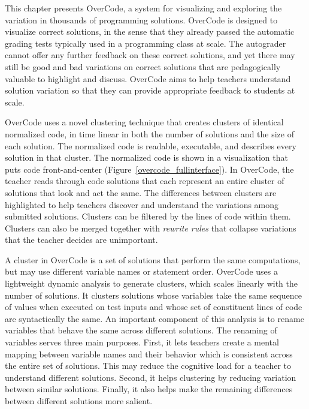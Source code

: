 This chapter presents OverCode, a system for visualizing and exploring the variation in thousands of programming solutions. OverCode is designed to visualize correct solutions, in the sense that they already passed the automatic grading tests typically used in a programming class at scale. The autograder cannot offer any further feedback on these correct solutions, and yet there may still be good and bad variations on correct solutions that are pedagogically valuable to highlight and discuss. OverCode aims to help teachers understand solution variation so that they can provide appropriate feedback to students at scale.

OverCode uses a novel clustering technique that creates clusters of identical normalized code, in time linear in both the number of solutions and the size of each solution. The normalized code is readable, executable, and describes every solution in that cluster.  The normalized code is shown in a visualization that puts code front-and-center (Figure~\ref{overcode_fullinterface}). In OverCode, the teacher reads through code solutions that each represent an entire cluster of solutions that look and act the same. The differences between clusters are highlighted to help teachers discover and understand the variations among submitted solutions. Clusters can be filtered by the lines of code within them.  Clusters can also be merged together with {\em rewrite rules} that collapse variations that the teacher decides are unimportant. 

A cluster in OverCode is a set of solutions that perform the same computations, but may use different variable names or statement order.  OverCode uses a lightweight dynamic analysis to generate clusters, which scales linearly with the number of solutions. It clusters solutions whose variables take the same sequence of values when executed on test inputs and whose set of constituent lines of code are syntactically the same. An important component of this analysis is to rename variables that behave the same across different solutions. The renaming of variables serves three main purposes. First, it lets teachers create a mental mapping between variable names and their behavior which is consistent across the entire set of solutions. This may reduce the cognitive load for a teacher to understand different solutions. Second, it helps clustering by reducing variation between similar solutions. Finally, it also helps make the remaining differences between different solutions more salient. 

